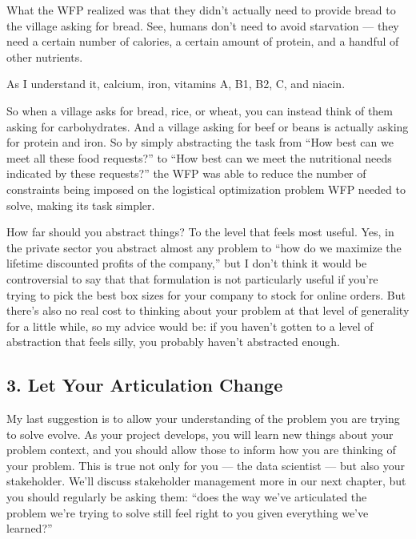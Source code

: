 \documentclass[letterpaper,10pt,english]{jupyterBook}
\begin{document}
\sphinxAtStartPar
What the WFP realized was that they didn’t actually need to provide bread to the village asking for bread. See, humans don’t need  to avoid starvation — they need a certain number of calories, a certain amount of protein, and a handful of other nutrients.%
\begin{footnote}[3]\sphinxAtStartFootnote
As I understand it, calcium, iron, vitamins A, B1, B2, C, and niacin.
%
\end{footnote} So when a village asks for bread, rice, or wheat, you can instead think of them asking for carbohydrates. And a village asking for beef or beans is actually asking for protein and iron. So by simply abstracting the task from “How best can we meet all these food requests?” to “How best can we meet the nutritional needs indicated by these requests?” the WFP was able to  reduce the number of constraints being imposed on the logistical optimization problem WFP needed to solve, making its task  simpler.

\sphinxAtStartPar
How far should you abstract things? To the level that feels most useful. Yes, in the private sector you  abstract almost any problem to “how do we maximize the lifetime discounted profits of the company,” but I don’t think it would be controversial to say that that formulation is not particularly useful if you’re trying to pick the best box sizes for your company to stock for online orders. But there’s also no real cost to thinking about your problem at that level of generality for a little while, so my advice would be: if you haven’t gotten to a level of abstraction that feels silly, you probably haven’t abstracted enough.


\subsection{3. Let Your Articulation Change}
\label{\detokenize{20_problems_to_questions/10_solving_the_right_problem:let-your-articulation-change}}
\sphinxAtStartPar
My last suggestion is to allow your understanding of the problem you are trying to solve evolve. As your project develops, you will learn new things about your problem context, and you should allow those to inform how you are thinking of your problem. This is true not only for you — the data scientist — but also your stakeholder. We’ll discuss stakeholder management more in our next chapter, but you should regularly be asking them: “does the way we’ve articulated the problem we’re trying to solve still feel right to you given everything we’ve learned?”
\end{document}
